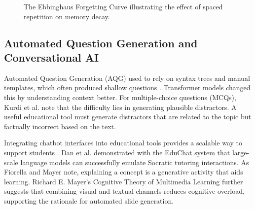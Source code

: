 \begin{figure}[htbp]
\centering
{}
\caption{The Ebbinghaus Forgetting Curve illustrating the effect of spaced repetition on memory decay.}
\label{fig:ebbinghaus}
\end{figure}

\subsection{Automated Question Generation and Conversational AI}
Automated Question Generation (AQG) used to rely on syntax trees and manual templates, which often produced shallow questions \cite{kurdi2020systematic}. Transformer models changed this by understanding context better. For multiple-choice questions (MCQs), Kurdi et al. \cite{kurdi2020systematic} note that the difficulty lies in generating plausible distractors. A useful educational tool must generate distractors that are related to the topic but factually incorrect based on the text.

Integrating chatbot interfaces into educational tools provides a scalable way to support students \cite{winkler2020conversational}. Dan et al. \cite{dan2023educhat} demonstrated with the EduChat system that large-scale language models can successfully emulate Socratic tutoring interactions. As Fiorella and Mayer \cite{fiorella2015learning} note, explaining a concept is a generative activity that aids learning. Richard E. Mayer's Cognitive Theory of Multimedia Learning \cite{mayer2014cambridge} further suggests that combining visual and textual channels reduces cognitive overload, supporting the rationale for automated slide generation.

